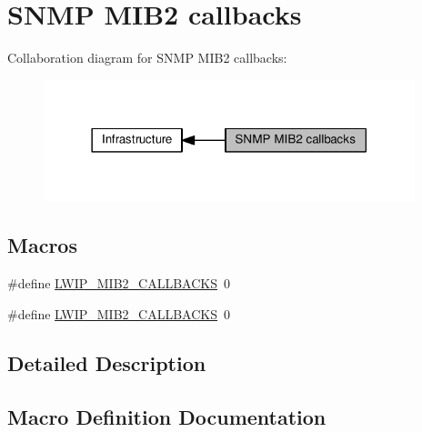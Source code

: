 \hypertarget{group__lwip__opts__mib2}{}\section{S\+N\+MP M\+I\+B2 callbacks}
\label{group__lwip__opts__mib2}
Collaboration diagram for S\+N\+MP M\+I\+B2 callbacks\+:
\nopagebreak
\begin{figure}[H]
\begin{center}
\leavevmode
\includegraphics[width=306pt]{group__lwip__opts__mib2}
\end{center}
\end{figure}
\subsection*{Macros}
\begin{DoxyCompactItemize}
\item 
\#define \hyperlink{group__lwip__opts__mib2_gad84d6a781880cec19a1ef4b2339fea29}{L\+W\+I\+P\+\_\+\+M\+I\+B2\+\_\+\+C\+A\+L\+L\+B\+A\+C\+KS}~0
\item 
\#define \hyperlink{group__lwip__opts__mib2_gad84d6a781880cec19a1ef4b2339fea29}{L\+W\+I\+P\+\_\+\+M\+I\+B2\+\_\+\+C\+A\+L\+L\+B\+A\+C\+KS}~0
\end{DoxyCompactItemize}


\subsection{Detailed Description}


\subsection{Macro Definition Documentation}
\mbox{\label{group__lwip__opts__mib2_gad84d6a781880cec19a1ef4b2339fea29}} 
